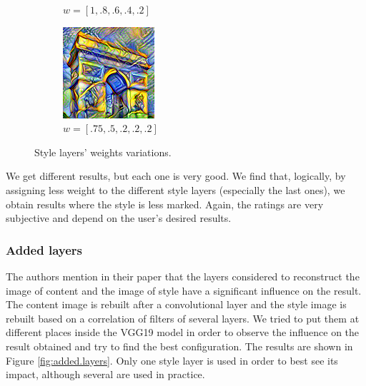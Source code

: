 \documentclass[twocolumn,superscriptaddress,aps,floatfix,nofootinbib]{revtex4-1}
\begin{document}
\begin{figure}[ht]
\begin{subfigure}[b]{0.13\textwidth}
            \caption{$w = [1, .8, .6, .4, .2]$}
        \end{subfigure}
        \hfill
        \begin{subfigure}[b]{0.13\textwidth}
            \centering
            \includegraphics[width=\textwidth]{resources/png/weights/sun-trees-paris-high-decreasing-weights.png}
            \caption{$w = [.75, .5, .2, .2, .2]$}
        \end{subfigure}
        \caption{Style layers' weights variations.}
        \label{fig:weights.style.layers}
    \end{figure}
    
    We get different results, but each one is very good. We find that, logically, by assigning less weight to the different style layers (especially the last ones), we obtain results where the style is less marked. Again, the ratings are very subjective and depend on the user's desired results.
    
    \subsubsection{Added layers}
    
    The authors mention in their paper that the layers considered to reconstruct the image of content and the image of style have a significant influence on the result. The content image is rebuilt after a convolutional layer and the style image is rebuilt based on a correlation of filters of several layers. We tried to put them at different places inside the VGG19 model in order to observe the influence on the result obtained and try to find the best configuration. The results are shown in Figure \ref{fig:added.layers}. Only one style layer is used in order to best see its impact, although several are used in practice.
    
\end{document}
